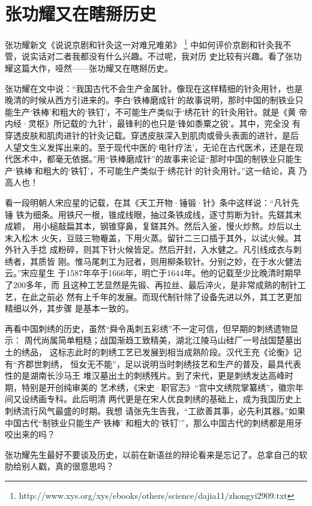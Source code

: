 \chapter{张功耀又在瞎掰历史}


张功耀新文《说说京剧和针灸这一对难兄难弟》
\footnote{http://www.xys.org/xys/ebooks/others/science/dajia11/zhongyi2909.txt}
中如何评价京剧和针灸我不管，说实话对二者我都没有什么兴趣。不过呢，我对历
史比较有兴趣。看了张功耀这篇大作，哑然——张功耀又在瞎掰历史。

张功耀在文中说：“我国古代不会生产金属针。像现在这样精细的针灸用针，也是
晚清的时候从西方引进来的。李白‘铁棒磨成针’的故事说明，那时中国的制铁业只
能生产‘铁棒’和粗大的‘铁钉’，不可能生产类似于‘绣花针’的针灸用针。就是《黄
帝内经·灵枢》所记载的‘九针’，最锋利的也只是‘锋如黍粟之锐’。其中，完全没
有穿透皮肤和肌肉进针的针灸记载。穿透皮肤深入到肌肉或骨头表面的进针，是后
人望文生义发挥出来的。至于现代中医的‘电针疗法’，无论在古代医术，还是在现
代医术中，都毫无依据。”用“铁棒磨成针”的故事来论证“那时中国的制铁业只能生
产‘铁棒’和粗大的‘铁钉’，不可能生产类似于‘绣花针’的针灸用针。”这一结论，真
乃高人也！

看一段明朝人宋应星的记载，在其《天工开物·锤锻·针》条中这样说：“凡针先锤
铁为细条。用铁尺一根，锥成线眼，抽过条铁成线，逐寸剪断为针。先鎈其末成颖，
用小槌敲扁其本，钢锥穿鼻，复鎈其外。然后入釜，慢火炒熬。炒后以土末入松木
火矢，豆豉三物罨盖，下用火蒸。留针二三口插于其外，以试火候。其外针入手捻
成粉碎，则其下针火候皆足。然后开封，入水健之。凡引线成衣与刺绣者，其质皆
刚。惟马尾刺工为冠者，则用柳条软针。分别之妙，在于水火健法云。”宋应星生
于1587年卒于1666年，明亡于1644年。他的记载至少比晚清时期早了200多年，而
且这种工艺显然是先锻、再拉丝、最后淬火，是非常成熟的制针工艺，在此之前必
然有上千年的发展。而现代制针除了设备先进以外，其工艺更加精细以外，其步骤
是基本一致的。

再看中国刺绣的历史，虽然“舜令禹刺五彩绣”不一定可信，但早期的刺绣遗物显示：
周代尚属简单粗糙；战国渐趋工致精美，湖北江陵马山硅厂一号战国楚墓出土的绣品，
这标志此时的刺绣工艺已发展到相当成熟阶段。汉代王充《论衡》记有“齐郡世刺绣，
恒女无不能”，足以说明当时刺绣技艺和生产的普及，最具代表性的是湖南长沙马王
堆汉墓出土的刺绣残片。到了宋代，更是刺绣发达高峰时期，特别是开创纯审美的
艺术绣，《宋史·职官志》“宫中文绣院掌纂绣”，徽宗年间又设绣画专科。此后明清
两代更是在宋人优良刺绣的基础上，成为我国历史上刺绣流行风气最盛的时期。我想
请张先生告我，“工欲善其事，必先利其器。”如果中国古代“制铁业只能生产‘铁棒’
和粗大的‘铁钉’”，那么中国古代的刺绣都是用牙咬出来的吗？

张功耀先生最好不要谈及历史，以前在新语丝的辩论看来是忘记了。总拿自己的软
肋给别人戳，真的很意思吗？
